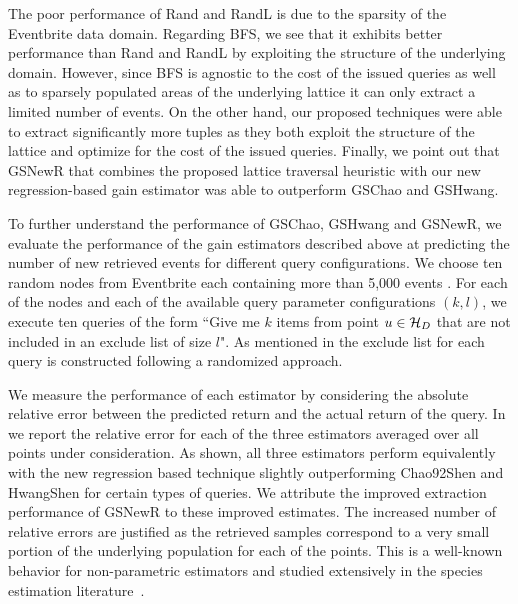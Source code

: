 
The poor performance of Rand and RandL is due to the sparsity of the Eventbrite data domain. Regarding BFS, we see that it exhibits better performance than Rand and RandL by exploiting the structure of the underlying domain. However, since BFS is agnostic to the cost of the issued queries as well as to sparsely populated areas of the underlying lattice it can only extract a limited number of events. On the other hand, our proposed techniques were able to extract significantly more tuples as they both exploit the structure of the lattice and optimize for the cost of the issued queries. Finally, we point out that GSNewR that combines the proposed lattice traversal heuristic with our new regression-based gain estimator was able to outperform GSChao and GSHwang. 

To further understand the performance of GSChao, GSHwang and GSNewR, we evaluate the performance of the gain estimators described above at predicting the number of new retrieved events for different query configurations. We choose ten random nodes from Eventbrite each containing more than 5,000 events . For each of the nodes and each of the available query parameter configurations $(k,l)$, we execute ten queries of the form ``Give me $k$ items from point $u \in \mathcal{H}_D$ that are not included in an exclude list of size $l$". As mentioned in  the exclude list for each query is constructed following a randomized approach. 

We measure the performance of each estimator by considering the absolute relative error between the predicted return and the actual return of the query. In  we report the relative error for each of the three estimators averaged over all points under consideration. As shown, all three estimators perform equivalently with the new regression based technique slightly outperforming Chao92Shen and HwangShen for certain types of queries. We attribute the improved extraction performance of GSNewR to these improved estimates. The increased number of relative errors are justified as the retrieved samples correspond to a very small portion of the underlying population for each of the points. This is a well-known behavior for non-parametric estimators and studied extensively in the species estimation literature~\cite{hwang:2010}. 

